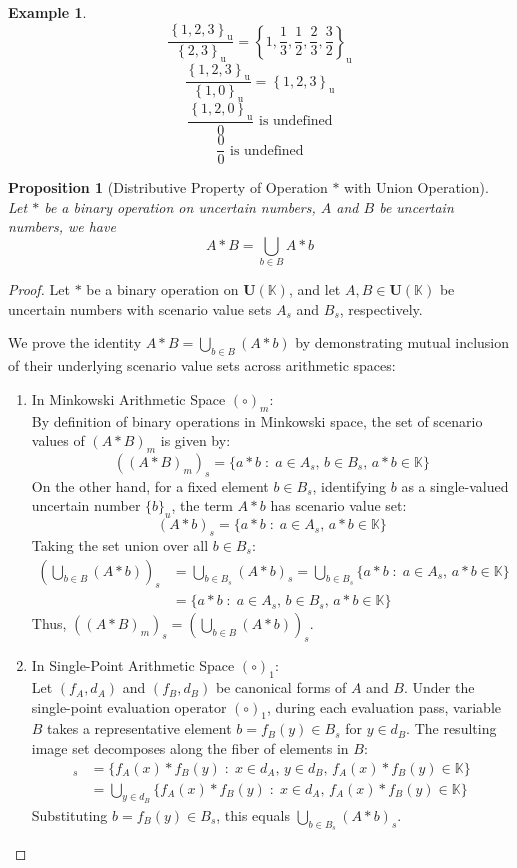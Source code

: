 \documentclass[a4paper,12pt,twoside]{memoir}
\newtheorem{md}{Proposition}[chapter]
\newtheorem{example}{Example}[chapter]
\newcommand{\set}[1]{\left\{#1\right\}} %
\newcommand{\s}[1]{\set{#1}_\mathrm{u}} %
\newcommand{\tsbd}[1]{\mathbf{U}(\mathbb{#1})}
\newcommand{\kgdd}[1]{\left(#1\right)_1} %
\begin{document}
	\begin{example}
		$$\frac{\s{1,2,3}}{\s{2,3}} = \s{1,\frac{1}{3},\frac{1}{2},\frac{2}{3},\frac{3}{2}}$$
		$$\frac{\s{1,2,3}}{\s{1,0}} = \s{1,2,3}$$
		$$\frac{\s{1,2,0}}{0} \text{ is undefined}$$
		$$\frac{0}{0} \text{ is undefined}$$
	\end{example}
	
	\begin{md}[Distributive Property of Operation $*$ with Union Operation]
		Let $*$ be a binary operation on uncertain numbers, $A$ and $B$ be uncertain numbers, we have
		\[A*B = \bigcup_{b \in B} {A * b} \]
	\end{md}
	\begin{proof}
		Let $*$ be a binary operation on $\tsbd{K}$, and let $A, B \in \tsbd{K}$ be uncertain numbers with scenario value sets $A_s$ and $B_s$, respectively.
		
		We prove the identity $A * B = \bigcup_{b \in B} (A * b)$ by demonstrating mutual inclusion of their underlying scenario value sets across arithmetic spaces:
		
		\begin{enumerate}[leftmargin=*]
			\item In Minkowski Arithmetic Space $(\circ)_m$: \\
			By definition of binary operations in Minkowski space, the set of scenario values of $(A * B)_m$ is given by:
			\[
			((A * B)_m)_s = \{a * b \;:\; a \in A_s, \, b \in B_s, \, a * b \in \mathbb{K}\}
			\]
			On the other hand, for a fixed element $b \in B_s$, identifying $b$ as a single-valued uncertain number $\{b\}_u$, the term $A * b$ has scenario value set:
			\[
			(A * b)_s = \{a * b \;:\; a \in A_s, \, a * b \in \mathbb{K}\}
			\]
			Taking the set union over all $b \in B_s$:
			\begin{align*}
				\left( \bigcup_{b \in B} (A * b) \right)_s &= \bigcup_{b \in B_s} (A * b)_s = \bigcup_{b \in B_s} \{a * b \;:\; a \in A_s, \, a * b \in \mathbb{K}\} \\
				&= \{a * b \;:\; a \in A_s, \, b \in B_s, \, a * b \in \mathbb{K}\}
			\end{align*}
			Thus, $((A * B)_m)_s = \left( \bigcup_{b \in B} (A * b) \right)_s$.
			
			\item In Single-Point Arithmetic Space $(\circ)_1$: \\
			Let $(f_A, d_A)$ and $(f_B, d_B)$ be canonical forms of $A$ and $B$. Under the single-point evaluation operator $\kgdd{\circ}$, during each evaluation pass, variable $B$ takes a representative element $b = f_B(y) \in B_s$ for $y \in d_B$. The resulting image set decomposes along the fiber of elements in $B$:
			\begin{align*}
				[\kgdd{A * B}]_s &= \{f_A(x) * f_B(y) \;:\; x \in d_A, \, y \in d_B, \, f_A(x) * f_B(y) \in \mathbb{K}\} \\
				&= \bigcup_{y \in d_B} \{f_A(x) * f_B(y) \;:\; x \in d_A, \, f_A(x) * f_B(y) \in \mathbb{K}\}
			\end{align*}
			Substituting $b = f_B(y) \in B_s$, this equals $\bigcup_{b \in B_s} (A * b)_s$.
		\end{enumerate}
		

\end{proof}
\end{document}
